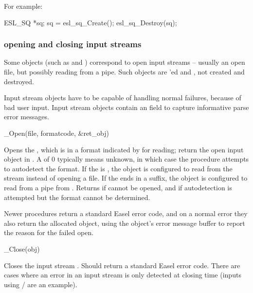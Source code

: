 For example:
\begin{cchunk}
   ESL_SQ *sq;
   sq = esl_sq_Create();
   esl_sq_Destroy(sq);
\end{cchunk}




  \subsubsection{opening and closing input streams}

Some objects (such as  and )
correspond to open input streams -- usually an open file, but possibly
reading from a pipe. Such objects are 'ed and
, not created and destroyed.

Input stream objects have to be capable of handling normal failures,
because of bad user input. Input stream objects contain an
 field to capture informative parse error
messages. 

\begin{sreapi}
\hypertarget{ifc:Open} 
{\item[\_Open(file, formatcode, \&ret\_obj)]}

Opens the , which is in a format indicated by
 for reading; return the open input object in
. A  of 0 typically means unknown,
in which case the  procedure attempts to autodetect
the format. If the  is , the object is
configured to read from the  stream instead of opening a
file. If the  ends in a  suffix, the object is
configured to read from a pipe from . Returns
 if  cannot be opened, and
 if autodetection is attempted but the format cannot
be determined. 

Newer  procedures return a standard Easel error code,
and on a normal error they also return the allocated object, using the
object's error message buffer to report the reason for the failed
open.

\hypertarget{ifc:Close} 
{\item[\_Close(obj)]}

Closes the input stream . Should return a standard Easel
error code. There are cases where an error in an input stream is only
detected at closing time (inputs using /
  are an example).
\end{sreapi}

